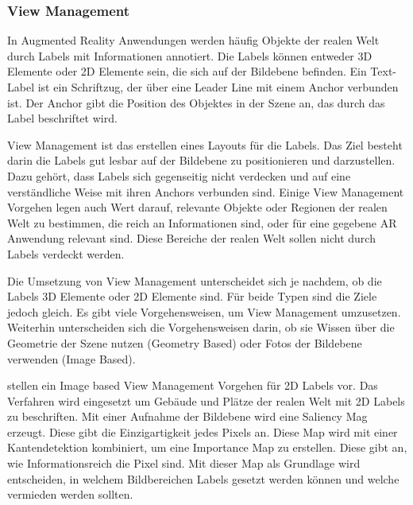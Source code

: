 
\subsubsection{View Management}

In Augmented Reality Anwendungen werden häufig Objekte der realen Welt durch Labels mit Informationen annotiert. Die Labels können entweder 3D Elemente oder 2D Elemente sein, die sich auf der Bildebene befinden. Ein Text-Label ist ein Schriftzug, der über eine Leader Line mit einem Anchor verbunden ist. Der Anchor gibt die Position des Objektes in der Szene an, das durch das Label beschriftet wird.

View Management ist das erstellen eines Layouts für die Labels. Das Ziel besteht darin die Labels gut lesbar auf der Bildebene zu positionieren und darzustellen. Dazu gehört, dass Labels sich gegenseitig nicht verdecken und auf eine verständliche Weise mit ihren Anchors verbunden sind. Einige View Management Vorgehen legen auch Wert darauf, relevante Objekte oder Regionen der realen Welt zu bestimmen, die reich an Informationen sind, oder für eine gegebene AR Anwendung relevant sind. Diese Bereiche der realen Welt sollen nicht durch Labels verdeckt werden.

Die Umsetzung von View Management unterscheidet sich je nachdem, ob die Labels 3D Elemente oder 2D Elemente sind. Für beide Typen sind die Ziele jedoch gleich. Es gibt viele Vorgehensweisen, um View Management umzusetzen. Weiterhin unterscheiden sich die Vorgehensweisen darin, ob sie Wissen über die Geometrie der Szene nutzen (Geometry Based) oder Fotos der Bildebene verwenden (Image Based).


\citep{viewManagementGrasset} stellen ein Image based View Management Vorgehen für 2D Labels vor. Das Verfahren wird eingesetzt um Gebäude und Plätze der realen Welt mit 2D Labels zu beschriften. Mit einer Aufnahme der Bildebene wird eine Saliency Mag erzeugt. Diese gibt die Einzigartigkeit jedes Pixels an. Diese Map wird mit einer Kantendetektion kombiniert, um eine Importance Map zu erstellen. Diese gibt an, wie Informationsreich die Pixel sind. Mit dieser Map als Grundlage wird entscheiden, in welchem Bildbereichen Labels gesetzt werden können und welche vermieden werden sollten.

